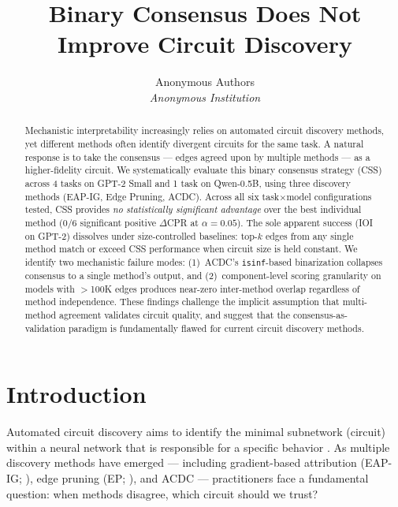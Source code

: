 \documentclass[11pt,a4paper]{article}
\title{Binary Consensus Does Not Improve Circuit Discovery}
\author{
  Anonymous Authors\\
  \textit{Anonymous Institution}
}
\date{}
\begin{document}
\maketitle

\begin{abstract}
Mechanistic interpretability increasingly relies on automated circuit discovery methods, yet different methods often identify divergent circuits for the same task. A natural response is to take the consensus --- edges agreed upon by multiple methods --- as a higher-fidelity circuit. We systematically evaluate this binary consensus strategy (CSS) across 4 tasks on GPT-2 Small and 1 task on Qwen-0.5B, using three discovery methods (EAP-IG, Edge Pruning, ACDC). Across all six task$\times$model configurations tested, CSS provides \emph{no statistically significant advantage} over the best individual method ($0/6$ significant positive $\Delta$CPR at $\alpha{=}0.05$). The sole apparent success (IOI on GPT-2) dissolves under size-controlled baselines: top-$k$ edges from any single method match or exceed CSS performance when circuit size is held constant. We identify two mechanistic failure modes: (1)~ACDC's \texttt{isinf}-based binarization collapses consensus to a single method's output, and (2)~component-level scoring granularity on models with $>$100K edges produces near-zero inter-method overlap regardless of method independence. These findings challenge the implicit assumption that multi-method agreement validates circuit quality, and suggest that the consensus-as-validation paradigm is fundamentally flawed for current circuit discovery methods.
\end{abstract}

\section{Introduction}

Automated circuit discovery aims to identify the minimal subnetwork (circuit) within a neural network that is responsible for a specific behavior \citep{conmy2023towards,wang2023interpretability}. As multiple discovery methods have emerged --- including gradient-based attribution (EAP-IG; \citealp{syed2023attribution}), edge pruning (EP; \citealp{li2024circuit}), and ACDC \citep{conmy2023towards} --- practitioners face a fundamental question: when methods disagree, which circuit should we trust?
\end{document}
